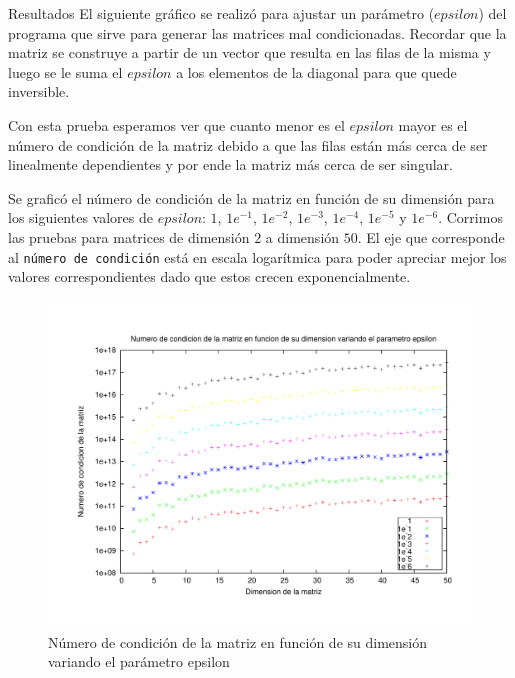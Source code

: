 \begin{section}{Resultados}
	El siguiente gráfico se realizó para ajustar un parámetro ($epsilon$) del programa que sirve para generar las matrices mal condicionadas. Recordar que la matriz se construye a partir de un vector que resulta en las filas de la misma y luego se le suma el $epsilon$ a los elementos de la diagonal para que quede inversible.
	
	Con esta prueba esperamos ver que cuanto menor es el $epsilon$ mayor es el número de condición de la matriz debido a que las filas están más cerca de ser linealmente dependientes y por ende la matriz más cerca de ser singular.

	Se graficó el número de condición de la matriz en función de su dimensión para los siguientes valores de $epsilon$: $1$, $1e^{-1}$, $1e^{-2}$, $1e^{-3}$, $1e^{-4}$, $1e^{-5}$ y $1e^{-6}$. Corrimos las pruebas para matrices de dimensión $2$ a dimensión $50$.
	El eje que corresponde al \texttt{número de condición} está en escala logarítmica para poder apreciar mejor los valores correspondientes dado que estos crecen exponencialmente.

	\begin{figure}[H]
	  \centering
		\includegraphics[width=14cm]{graficos/ajuste_epsilon.pdf}
	  \caption{Número de condición de la matriz en función de su dimensión variando el parámetro epsilon}
	  \label{fig:epsilon}
	\end{figure}
\end{section}
